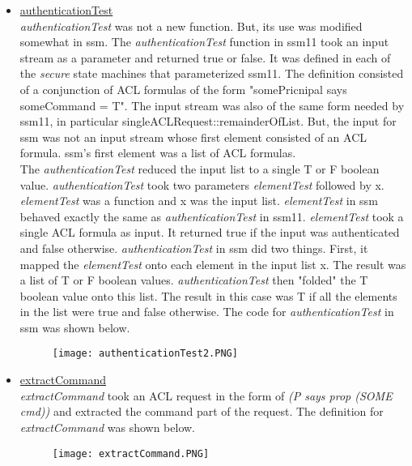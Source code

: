    \begin{itemize}
   
   \item \underline{authenticationTest}\\
     \emph{authenticationTest} was not a new function.  But, its use was modified somewhat in ssm. The \emph{authenticationTest} function in ssm11 took an input stream as a parameter and returned true or false.  It was defined in each of the \emph{secure} state machines that parameterized ssm11.  The definition consisted of a conjunction of ACL formulas of the form "somePricnipal says someCommand = T".  The input stream was also of the same form needed by ssm11, in particular singleACLRequest::remainderOfList.  But, the input for ssm was not an input stream whose first element consisted of an ACL formula.  ssm's first element was a list of ACL formulas.  \\
      
    The \emph{authenticationTest} reduced the input list to a single T or F boolean value.  \emph{authenticationTest} took two parameters \emph{elementTest} followed by x.  \emph{elementTest} was a function and x was the input list.  \emph{elementTest} in ssm behaved exactly the same as \emph{authenticationTest} in ssm11.  \emph{elementTest} took a single ACL formula as input.  It returned true if the input was authenticated and false otherwise.  \emph{authenticationTest} in ssm did two things.  First, it mapped the \emph{elementTest} onto each element in the input list x. The result was a list of T or F boolean values.  \emph{authenticationTest} then "folded" the T boolean value onto this list.  The result in this case was T if all the elements in the list were true and false otherwise.  The code for \emph{authenticationTest} in ssm was shown below. \\
      
\begin{figure}[h]
  \centering
  \texttt{[image: authenticationTest2.PNG]}
\end{figure}

 \item \underline{extractCommand}\\
 \emph{extractCommand} took an ACL request in the form of \emph{(P says prop (SOME cmd))} and extracted the command part of the request.  The definition for \emph{extractCommand} was shown below.\\
  
  \begin{figure}[h]
  \centering
  \texttt{[image: extractCommand.PNG]}
\end{figure}


\end{itemize}
